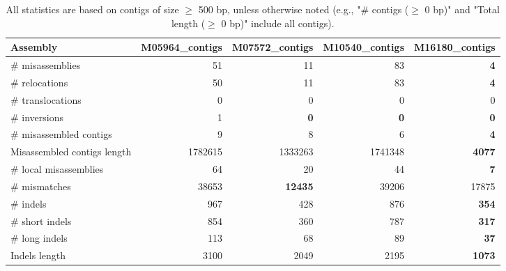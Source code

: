 \documentclass[12pt,a4paper]{article}
\begin{document}
\begin{table}[ht]
\begin{center}
\caption{All statistics are based on contigs of size $\geq$ 500 bp, unless otherwise noted (e.g., "\# contigs ($\geq$ 0 bp)" and "Total length ($\geq$ 0 bp)" include all contigs).}
\begin{tabular}{|l*{4}{|r}|}
\hline
Assembly & M05964\_contigs & M07572\_contigs & M10540\_contigs & M16180\_contigs \\ \hline
\# misassemblies & 51 & 11 & 83 & {\bf 4} \\ \hline
\hspace{5mm}\# relocations & 50 & 11 & 83 & {\bf 4} \\ \hline
\hspace{5mm}\# translocations & 0 & 0 & 0 & 0 \\ \hline
\hspace{5mm}\# inversions & 1 & {\bf 0} & {\bf 0} & {\bf 0} \\ \hline
\# misassembled contigs & 9 & 8 & 6 & {\bf 4} \\ \hline
Misassembled contigs length & 1782615 & 1333263 & 1741348 & {\bf 4077} \\ \hline
\# local misassemblies & 64 & 20 & 44 & {\bf 7} \\ \hline
\# mismatches & 38653 & {\bf 12435} & 39206 & 17875 \\ \hline
\# indels & 967 & 428 & 876 & {\bf 354} \\ \hline
\hspace{5mm}\# short indels & 854 & 360 & 787 & {\bf 317} \\ \hline
\hspace{5mm}\# long indels & 113 & 68 & 89 & {\bf 37} \\ \hline
Indels length & 3100 & 2049 & 2195 & {\bf 1073} \\ \hline
\end{tabular}
\end{center}
\end{table}
\end{document}
